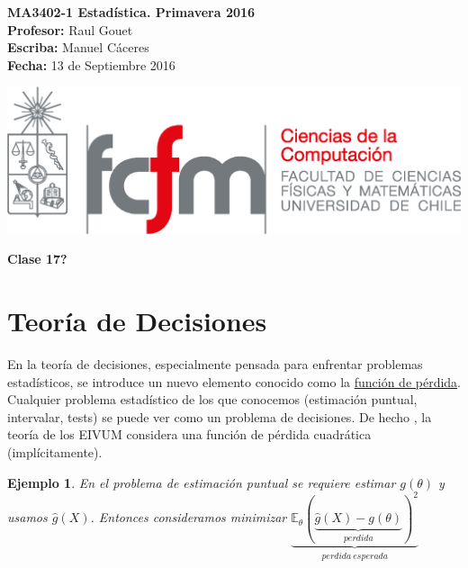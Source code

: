 \documentclass[10pt]{article}
\theoremstyle{plain}
\newtheorem{ej}{Ejemplo}
\theoremstyle{definition}
\newcommand{\catnum}{17?} %
\newcommand{\fecha}{13 de Septiembre 2016 }
\begin{document}
\vspace*{-1.2 cm}
\begin{minipage}{0.6\textwidth}
\begin{flushleft}
\hspace*{-0.5cm}\textbf{MA3402-1 Estadística. Primavera 2016}\\
\hspace*{-0.5cm}\textbf{Profesor:} Raul Gouet\\
\hspace*{-0.5cm}\textbf{Escriba:} Manuel Cáceres\\
\hspace*{-0.5cm}\textbf{Fecha:} \fecha
\end{flushleft}
\end{minipage}
\begin{minipage}{0.36\textwidth}
\begin{flushright}
\includegraphics[scale=0.3]{imagenes/fcfm_dcc}
\end{flushright}
\end{minipage}
\bigskip

\begin{center}
\LARGE\textbf{Clase \catnum}
\end{center}
\section{Teoría de Decisiones}
En la teoría de decisiones, especialmente pensada para enfrentar problemas estadísticos, se introduce un nuevo elemento conocido como la \underline{función de pérdida}.\\

Cualquier problema estadístico de los que conocemos (estimación puntual, intervalar, tests) se puede ver como un problema de decisiones. De hecho , la teoría de los EIVUM considera una función de pérdida cuadrática (implícitamente).

\begin{ej} En el problema de estimación puntual se requiere estimar $g(\theta)$ y usamos $\hat{g}(X)$. Entonces consideramos minimizar $\underbrace{\mathbb{E}_{\theta}(\underbrace{\hat{g}(X)-g(\theta)}_{perdida})^2}_{perdida\ esperada}$
\end{ej}
\end{document}
